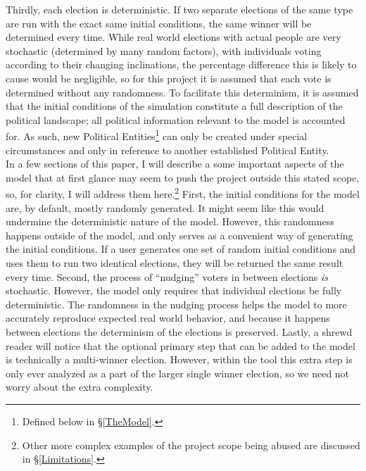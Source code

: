 \documentclass[12pt]{article}
\newcounter{step}
\begin{document}
\qquad Thirdly, each election is deterministic. If two separate elections of the same type are run with the exact same initial conditions, the same winner will be determined every time. While real world elections with actual people are very stochastic (determined by many random factors), with individuals voting according to their changing inclinations, the percentage difference this is likely to cause would be negligible, so for this project it is assumed that each vote is determined without any randomness. To facilitate this determinism, it is assumed that the initial conditions of the simulation constitute a full description of the political landscape; all political information relevant to the model is accounted for. As such, new Political Entities\footnote{Defined below in \S \ref{TheModel}.} can only be created under special circumstances and only in reference to another established Political Entity. \\

\qquad In a few sections of this paper, I will describe a some important aspects of the model that at first glance may seem to push the project outside this stated scope, so, for clarity, I will address them here.\footnote{Other more complex examples of the project scope being abused are discussed in \S \ref{Limitations}.} First, the initial conditions for the model are, by default, mostly randomly generated. It might seem like this would undermine the deterministic nature of the model. However, this randomness happens outside of the model, and only serves as a convenient way of generating the initial conditions. If a user generates one set of random initial conditions and uses them to run two identical elections, they will be returned the same result every time. Second, the process of ``nudging'' voters in between elections \textit{is} stochastic. However, the model only requires that individual elections be fully deterministic. The randomness in the nudging process helps the model to more accurately reproduce expected real world behavior, and because it happens between elections the determinism of the elections is preserved. Lastly, a shrewd reader will notice that the optional primary step that can be added to the model is technically a multi-winner election. However, within the tool this extra step is only ever analyzed as a part of the larger single winner election, so we need not worry about the extra complexity. \\

\end{document}
